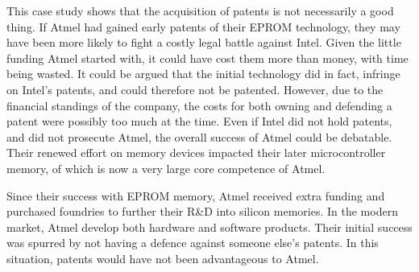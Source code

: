 This case study shows that the acquisition of patents is not necessarily a good thing.
If Atmel had gained early patents of their EPROM technology, they may have been more likely to fight a costly legal battle against Intel.
Given the little funding Atmel started with, it could have cost them more than money, with time being wasted. 
It could be argued that the initial technology did in fact, infringe on Intel's patents, and could therefore not be patented.
However, due to the financial standings of the company, the costs for both owning and defending a patent were possibly too much at the time.
Even if Intel did not hold patents, and did not prosecute Atmel, the overall success of Atmel could be debatable. 
Their renewed effort on memory devices impacted their later microcontroller memory, of which is now a very large core competence of Atmel.

Since their success with EPROM memory, Atmel received extra funding \cite{atmel:acq1} and purchased foundries to further their R\&D into silicon memories. 
In the modern market, Atmel develop both hardware and software products. 
Their initial success was spurred by not having a defence against someone else's patents. 
In this situation, patents would have not been advantageous to Atmel.

